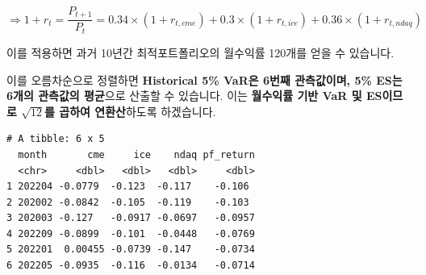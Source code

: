\documentclass[
  letterpaper,
  DIV=11,
  numbers=noendperiod]{scrreprt}
\newenvironment{Shaded}{\begin{snugshade}}{\end{snugshade}}
\newcommand{\AttributeTok}[1]{\textcolor[rgb]{0.40,0.45,0.13}{#1}}
\newcommand{\DecValTok}[1]{\textcolor[rgb]{0.68,0.00,0.00}{#1}}
\newcommand{\FunctionTok}[1]{\textcolor[rgb]{0.28,0.35,0.67}{#1}}
\newcommand{\NormalTok}[1]{\textcolor[rgb]{0.00,0.23,0.31}{#1}}
\newcommand{\OtherTok}[1]{\textcolor[rgb]{0.00,0.23,0.31}{#1}}
\newcommand{\SpecialCharTok}[1]{\textcolor[rgb]{0.37,0.37,0.37}{#1}}
\newcommand{\StringTok}[1]{\textcolor[rgb]{0.13,0.47,0.30}{#1}}
\begin{document}
\[\Rightarrow 1+r_t=\frac{P_{t+1}}{P_t}=0.34\times (1+r_{t,cme})+0.3\times (1+r_{t,ice})+0.36\times (1+r_{t,ndaq})\]

이를 적용하면 과거 10년간 최적포트폴리오의 월수익률 120개를 얻을 수
있습니다.

이를 오름차순으로 정렬하면 \textbf{Historical 5\% VaR은 6번째
관측값이며, 5\% ES는 6개의 관측값의 평균}으로 산출할 수 있습니다. 이는
\textbf{월수익률 기반 VaR 및 ES이므로 \(\sqrt{12}\)를 곱하여
연환산}하도록 하겠습니다.

\begin{Shaded}
\end{Shaded}

\begin{verbatim}
# A tibble: 6 x 5
  month       cme     ice    ndaq pf_return
  <chr>     <dbl>   <dbl>   <dbl>     <dbl>
1 202204 -0.0779  -0.123  -0.117    -0.106 
2 202002 -0.0842  -0.105  -0.119    -0.103 
3 202003 -0.127   -0.0917 -0.0697   -0.0957
4 202209 -0.0899  -0.101  -0.0448   -0.0769
5 202201  0.00455 -0.0739 -0.147    -0.0734
6 202205 -0.0935  -0.116  -0.0134   -0.0714
\end{verbatim}
\end{document}
